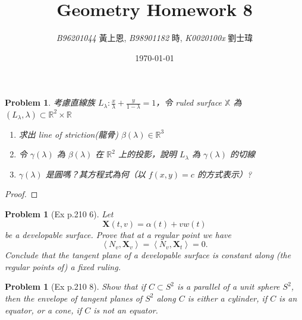 \documentclass[10pt,a4paper]{article}
\newcommand{\LiHei}{\CJKfamily{lh}}
\newcounter{theProblemCounter}
\newtheorem{problem}[theProblemCounter]{Problem}
\begin{document}
\title{{Geometry Homework 8}}
\author{{\it{B96201044}} {\LiHei 黃上恩}, {\it{B98901182}} {\LiHei 時}\rotatebox{180}{\raisebox{-1.0\height}{\begin{greek}Y\end{greek}}}{\LiHei 勳}, {\it{K0020100x}} {\LiHei 劉士瑋}}
\date{\today}
\maketitle

\newcommand{\bx}{\mathbb{X}}
\newcommand{\bfx}{\mathbf{X}}
\newcommand{\sech}{\mbox{sech}}
\setcounter{theProblemCounter}{1}
\begin{problem}
考慮直線族 $L_\lambda: \frac{x}{\lambda} + \frac{y}{1-\lambda}=1$，令 ruled surface $\bx$ 為 $(L_\lambda, \lambda)\subset \mathbb{R}^2\times \mathbb{R}$
\begin{enumerate}
\item[(a)] 求出 line of striction(龍骨) $\beta(\lambda)\in\mathbb{R}^3$
\item[(b)] 令 $\gamma(\lambda)$ 為 $\beta(\lambda)$ 在 $\mathbb{R}^2$ 上的投影，說明 $L_\lambda$ 為 $\gamma(\lambda)$ 的切線
\item[(c)] $\gamma(\lambda)$ 是圓嗎？其方程式為何（以 $f(x,y)=c$ 的方式表示）?
\end{enumerate}
\end{problem}
\begin{proof}
\end{proof}

\setcounter{theProblemCounter}{3}
\begin{problem}[Ex p.210 6]
Let \[
\bfx(t, v)=\alpha(t)+vw(t)
\]
be a developable surface. Prove that at a regular point we have
\[
\left\langle N_v, \bfx_v\right\rangle
=\left\langle N_v, \bfx_t\right\rangle=0.\]
Conclude that \emph{the tangent plane of a developable surface is constant along} (the regular points of) \emph{a fixed ruling}.
\end{problem}

\setcounter{theProblemCounter}{4}
\begin{problem}[Ex p.210 8]
Show that if $C\subset S^2$ is a parallel of a unit sphere $S^2$, then the envelope of tangent planes of $S^2$ along $C$ is either a cylinder, if $C$ is an equator, or a cone, if $C$ is not an equator.
\end{problem}
\end{document}
